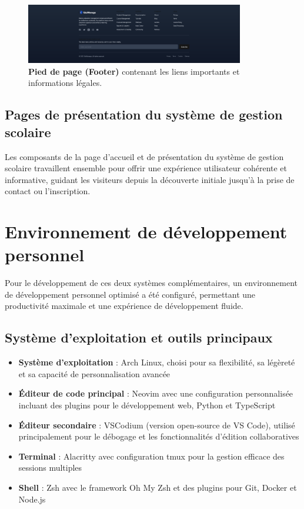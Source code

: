 \begin{figure}[H]
  \centering
  \includegraphics[width=0.85\textwidth,keepaspectratio]{pfe-pics/landing/fotter.png}
  \caption{\textbf{Pied de page (Footer)} contenant les liens importants et informations légales.}
  \label{fig:landing_footer}
\end{figure}

\subsection{Pages de présentation du système de gestion scolaire}

Les composants de la page d'accueil et de présentation du système de gestion scolaire travaillent ensemble pour offrir une expérience utilisateur cohérente et informative, guidant les visiteurs depuis la découverte initiale jusqu'à la prise de contact ou l'inscription.

\section{Environnement de développement personnel}

Pour le développement de ces deux systèmes complémentaires, un environnement de développement personnel optimisé a été configuré, permettant une productivité maximale et une expérience de développement fluide.

\subsection{Système d'exploitation et outils principaux}

\begin{itemize}
  \item \textbf{Système d'exploitation} : Arch Linux, choisi pour sa flexibilité, sa légèreté et sa capacité de personnalisation avancée
  
  \item \textbf{Éditeur de code principal} : Neovim avec une configuration personnalisée incluant des plugins pour le développement web, Python et TypeScript
  
  \item \textbf{Éditeur secondaire} : VSCodium (version open-source de VS Code), utilisé principalement pour le débogage et les fonctionnalités d'édition collaboratives
  
  \item \textbf{Terminal} : Alacritty avec configuration tmux pour la gestion efficace des sessions multiples
  
  \item \textbf{Shell} : Zsh avec le framework Oh My Zsh et des plugins pour Git, Docker et Node.js
\end{itemize}

